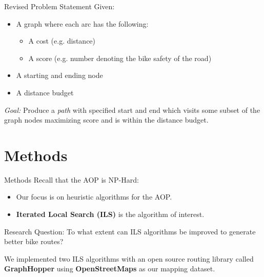 \documentclass{beamer}
\begin{document}
\begin{frame}{Revised Problem Statement}
Given:
\begin{itemize}
    \item A graph where each arc has the following:
    \begin{itemize}
        \item A cost (e.g. distance)
        \item A score (e.g. number denoting the bike safety of the road)
    \end{itemize}
    \item A starting and ending node
    \item A distance budget
\end{itemize}
\emph{Goal:} Produce a \emph{path} with specified start and end which visits some subset of the graph nodes maximizing score and is within the distance budget.
\end{frame}

\section{Methods}
\begin{frame}{Methods}
    Recall that the AOP is NP-Hard:
    \begin{itemize}
        \item Our focus is on heuristic algorithms for the AOP.
        \item \textbf{Iterated Local Search (ILS)} is the algorithm of interest.
    \end{itemize}
    
    \begin{alertblock}{Research Question:}
        To what extent can ILS algorithms be improved to generate better bike routes?
    \end{alertblock}
    
    We implemented two ILS algorithms with an open source routing library called \textbf{GraphHopper} using \textbf{OpenStreetMaps} as our mapping dataset.

\end{frame}
\end{document}
